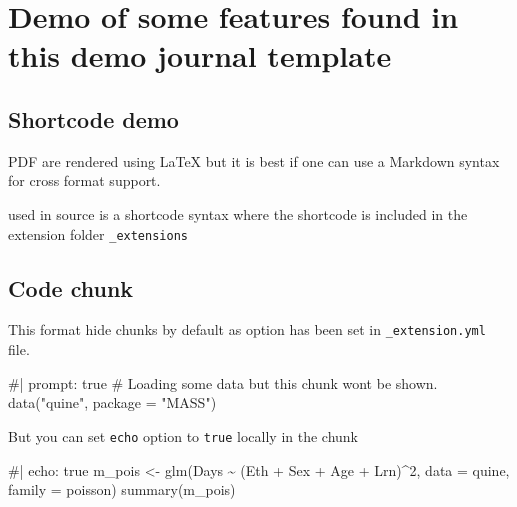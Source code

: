\documentclass[
  10pt,
]{scrartcl}
\newenvironment{Shaded}{\begin{snugshade}}{\end{snugshade}}
\newcommand{\AttributeTok}[1]{\textcolor[rgb]{0.40,0.45,0.13}{#1}}
\newcommand{\CommentTok}[1]{\textcolor[rgb]{0.37,0.37,0.37}{#1}}
\newcommand{\DecValTok}[1]{\textcolor[rgb]{0.68,0.00,0.00}{#1}}
\newcommand{\FunctionTok}[1]{\textcolor[rgb]{0.28,0.35,0.67}{#1}}
\newcommand{\NormalTok}[1]{\textcolor[rgb]{0.00,0.23,0.31}{#1}}
\newcommand{\OtherTok}[1]{\textcolor[rgb]{0.00,0.23,0.31}{#1}}
\newcommand{\SpecialCharTok}[1]{\textcolor[rgb]{0.37,0.37,0.37}{#1}}
\newcommand{\StringTok}[1]{\textcolor[rgb]{0.13,0.47,0.30}{#1}}
\begin{document}
\section{Demo of some features found in this demo journal
template}\label{demo-of-some-features-found-in-this-demo-journal-template}

\subsection{Shortcode demo}\label{sec-shortcode}

PDF are rendered using {\LaTeX} but it is best if one can use a Markdown
syntax for cross format support.

\texttt{} used in source is a shortcode syntax where the shortcode is
included in the extension folder \texttt{\_extensions}

\subsection{Code chunk}\label{sec-chunks}

This format hide chunks by default as option has been set in
\texttt{\_extension.yml} file.

\begin{Shaded}
\begin{Highlighting}[]
\CommentTok{\#| prompt: true}
\CommentTok{\# Loading some data but this chunk won\textquotesingle{}t be shown.}
\FunctionTok{data}\NormalTok{(}\StringTok{"quine"}\NormalTok{, }\AttributeTok{package =} \StringTok{"MASS"}\NormalTok{)}
\end{Highlighting}
\end{Shaded}

But you can set \texttt{echo} option to \texttt{true} locally in the
chunk

\begin{Shaded}
\begin{Highlighting}[]
\CommentTok{\#| echo: true}
\NormalTok{m\_pois }\OtherTok{\textless{}{-}} \FunctionTok{glm}\NormalTok{(Days }\SpecialCharTok{\textasciitilde{}}\NormalTok{ (Eth }\SpecialCharTok{+}\NormalTok{ Sex }\SpecialCharTok{+}\NormalTok{ Age }\SpecialCharTok{+}\NormalTok{ Lrn)}\SpecialCharTok{\^{}}\DecValTok{2}\NormalTok{, }\AttributeTok{data =}\NormalTok{ quine, }\AttributeTok{family =}\NormalTok{ poisson)}
\FunctionTok{summary}\NormalTok{(m\_pois)}
\end{Highlighting}
\end{Shaded}
\end{document}
